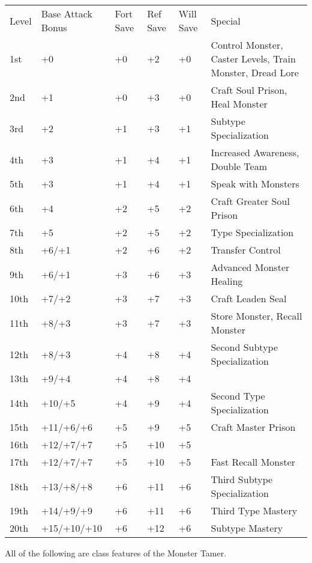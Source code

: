 \begin{table}[tbh]
\begin{small}
\begin{tabular}{lp{2cm}p{0.7cm}p{0.7cm}p{0.7cm}l}
Level  &Base Attack  Bonus &Fort Save &Ref Save &Will Save &Special\\
1st  &+0          &+0 &+2  &+0 & Control Monster, Caster Levels, Train Monster, Dread Lore \\
2nd  &+1          &+0 &+3  &+0 & Craft Soul Prison, Heal Monster \\
3rd  &+2          &+1 &+3  &+1 & Subtype Specialization \\
4th  &+3          &+1 &+4  &+1 & Increased Awareness, Double Team \\
5th  &+3          &+1 &+4  &+1 & Speak with Monsters \\
6th  &+4          &+2 &+5  &+2 & Craft Greater Soul Prison \\
7th  &+5          &+2 &+5  &+2 & Type Specialization \\
8th  &+6/+1       &+2 &+6  &+2 & Transfer Control \\
9th  &+6/+1       &+3 &+6  &+3 & Advanced Monster Healing \\
10th &+7/+2       &+3 &+7  &+3 & Craft Leaden Seal \\
11th &+8/+3       &+3 &+7  &+3 & Store Monster, Recall Monster \\
12th &+8/+3       &+4 &+8  &+4 & Second Subtype Specialization \\
13th &+9/+4       &+4 &+8  &+4 & \\
14th &+10/+5      &+4 &+9  &+4 & Second Type Specialization \\
15th &+11/+6/+6   &+5 &+9  &+5 & Craft Master Prison \\
16th &+12/+7/+7   &+5 &+10 &+5 & \\
17th &+12/+7/+7   &+5 &+10 &+5 & Fast Recall Monster \\
18th &+13/+8/+8   &+6 &+11 &+6 & Third Subtype Specialization \\
19th &+14/+9/+9   &+6 &+11 &+6 & Third Type Mastery \\
20th &+15/+10/+10 &+6 &+12 &+6 & Subtype Mastery \\
\end{tabular}
\end{small}
\end{table}

\smallskip\noindent All of the following are class features of the Monster Tamer.

